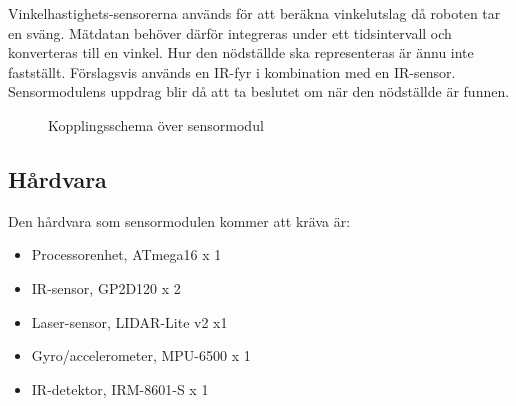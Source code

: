 \documentclass[11pt]{article}
\begin{document}
\begin{flushleft}
Vinkelhastighets-sensorerna används för att beräkna vinkelutslag då roboten tar en sväng. Mätdatan behöver därför integreras under ett tidsintervall och konverteras till en vinkel. Hur den nödställde ska representeras är ännu inte fastställt. Förslagsvis används en IR-fyr i kombination med en IR-sensor. Sensormodulens uppdrag blir då att ta beslutet om när den nödställde är funnen.

\begin{figure}[htbp]
\centering
\noindent{}
	\caption{Kopplingsschema över sensormodul \label{kopplingsschema:sensormodul}}	
\end{figure}
 
\subsection{Hårdvara}
Den hårdvara som sensormodulen kommer att kräva är:

\begin{itemize}
\item{Processorenhet, ATmega16 x 1}
\item{IR-sensor, GP2D120 x 2}
\item{Laser-sensor, LIDAR-Lite v2 x1}
\item{Gyro/accelerometer, MPU-6500 x 1}
\item{IR-detektor, IRM-8601-S x 1}


\end{itemize}
\end{flushleft}
\end{document}
